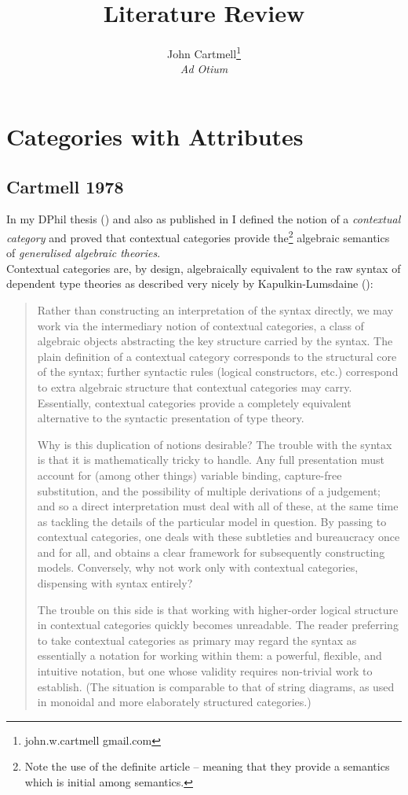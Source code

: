 \documentclass[14pt,a4paper]{scrartcl}
\title{Literature Review}
\author{John Cartmell\footnote{john.w.cartmell gmail.com}\\ \normalsize{\textit{Ad Otium}}}
\begin{document}
\maketitle

\section{Categories with Attributes} 


\subsection{Cartmell 1978}

In my DPhil thesis (\cite{Cartmell78}) and also as published in \cite{Cartmell86}
I defined the notion of a \textit{contextual category} and proved that contextual
categories provide the\footnote{Note the use of the definite article -- meaning that they provide a semantics which is initial among semantics.} algebraic semantics of \textit{generalised algebraic theories}. \\

\noindent 
Contextual categories are, by design,  algebraically equivalent to the raw syntax of dependent type theories as described very nicely by Kapulkin-Lumsdaine (\cite{kapulkinlumsdaine2012}): \\

\begin{quote}
Rather than constructing an interpretation of the syntax directly, we may work via the intermediary notion of contextual categories, a class of algebraic objects abstracting the key structure carried by the syntax. The plain definition of a contextual category corresponds to the structural core of the syntax; further syntactic rules (logical constructors, etc.) correspond to extra algebraic structure that contextual categories may carry. Essentially, contextual categories provide a completely equivalent alternative to the syntactic presentation of type theory.

Why is this duplication of notions desirable? The trouble with the syntax is that it is mathematically tricky to handle. Any full presentation must account for (among other things) variable binding, capture-free substitution, and the possibility of multiple derivations of a judgement; and so a direct interpretation must deal with all of these, at the same time as tackling the details of the particular model in question. By passing to contextual categories, one deals with these subtleties and bureaucracy once and for all, and obtains a clear framework for subsequently constructing models. Conversely, why not work only with contextual categories, dispensing with syntax entirely?

The trouble on this side is that working with higher-order logical structure in contextual categories quickly becomes unreadable. The reader preferring to take contextual categories as primary may regard the syntax as essentially a notation for working within them: a powerful, flexible, and intuitive notation, but one whose validity requires non-trivial work to establish. (The situation is comparable to that of string diagrams, as used in monoidal and more elaborately structured categories.)
\end{quote}
\end{document}
